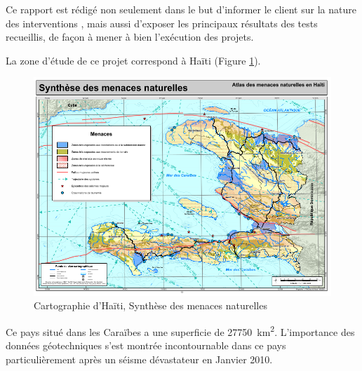 Ce rapport est rédigé non seulement dans le but d’informer le client sur la nature des interventions
, mais aussi d’exposer les principaux résultats des tests recueillis, de façon à mener à bien
l’exécution des projets.
\par
La zone d'étude de ce projet correspond à Haïti (Figure \ref{fig:haiti}).
\begin{figure}
    \centering
    \includegraphics[width=1\textwidth]{images/Contexte/haiti.png}
    \caption{Cartographie d'Haïti, Synthèse des menaces naturelles  \cite{ciat}}
    \label{fig:haiti}
\end{figure}
Ce pays situé dans les Caraïbes a une superficie de  \SI{27750}{\kilo\metre\squared}\cite{superficie}.
L'importance des données géotechniques s'est montrée incontournable dans ce pays particulièrement 
après un séisme dévastateur en Janvier 2010.

